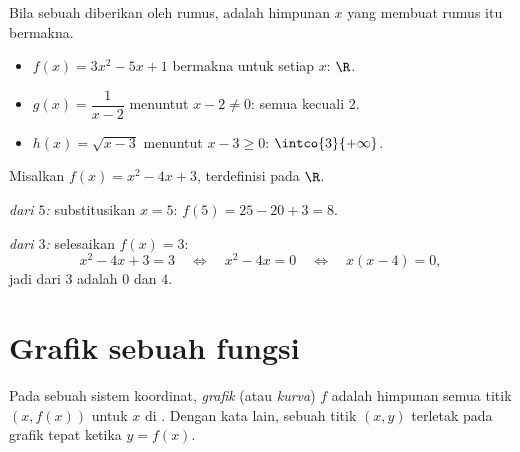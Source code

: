 \begin{example}\label{ex:g10:functions:domain}
Bila sebuah  diberikan oleh rumus,  adalah himpunan $x$
yang membuat rumus itu bermakna.
\begin{itemize}
  \item $f(x) = 3x^2 - 5x + 1$ bermakna untuk setiap $x$: 
        $\R$.
  \item $g(x) = \dfrac{1}{x - 2}$ menuntut $x - 2 \neq 0$: 
        semua  kecuali $2$.
  \item $h(x) = \sqrt{x - 3}$ menuntut $x - 3 \geq 0$: 
        $\intco{3}{+\infty}$.
\end{itemize}
\end{example}

\begin{example}\label{ex:g10:functions:images}
Misalkan $f(x) = x^2 - 4x + 3$, terdefinisi pada $\R$.

\emph{ dari $5$:} substitusikan $x = 5$:
$f(5) = 25 - 20 + 3 = 8$.

\emph{ dari $3$:} selesaikan $f(x) = 3$:
\[
x^2 - 4x + 3 = 3
\quad\Longleftrightarrow\quad
x^2 - 4x = 0
\quad\Longleftrightarrow\quad
x(x - 4) = 0,
\]
jadi  dari $3$ adalah $0$ dan $4$.
\end{example}

\section{Grafik sebuah fungsi}

\begin{definition}[Grafik]\label{def:g10:functions:graph}
Pada sebuah sistem koordinat, \emph{grafik} (atau \emph{kurva})
$f$ adalah himpunan semua titik $(x, f(x))$ untuk $x$ di .
Dengan kata lain, sebuah titik $(x, y)$ terletak pada grafik tepat ketika
$y = f(x)$.
\end{definition}

